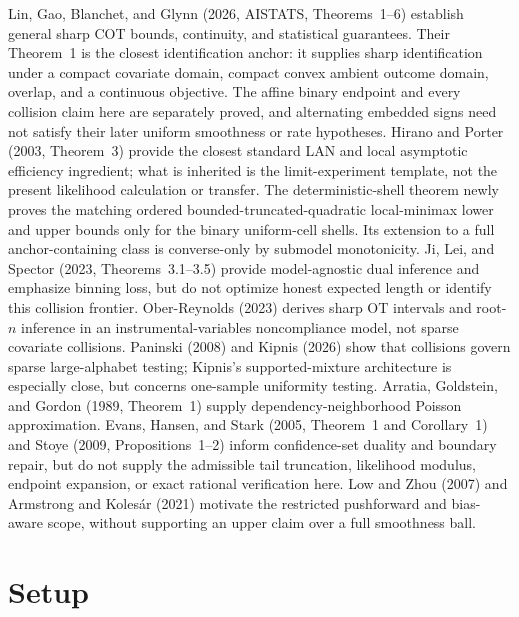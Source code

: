 \documentclass{article}
\begin{document}
Lin, Gao, Blanchet, and Glynn (2026, AISTATS, Theorems~1--6) establish general sharp COT bounds, continuity, and statistical guarantees. Their Theorem~1 is the closest identification anchor: it supplies sharp identification under a compact covariate domain, compact convex ambient outcome domain, overlap, and a continuous objective. The affine binary endpoint and every collision claim here are separately proved, and alternating embedded signs need not satisfy their later uniform smoothness or rate hypotheses. Hirano and Porter (2003, Theorem~3) provide the closest standard LAN and local asymptotic efficiency ingredient; what is inherited is the limit-experiment template, not the present likelihood calculation or transfer. The deterministic-shell theorem newly proves the matching ordered bounded-truncated-quadratic local-minimax lower and upper bounds only for the binary uniform-cell shells. Its extension to a full anchor-containing class is converse-only by submodel monotonicity. Ji, Lei, and Spector (2023, Theorems~3.1--3.5) provide model-agnostic dual inference and emphasize binning loss, but do not optimize honest expected length or identify this collision frontier. Ober-Reynolds (2023) derives sharp OT intervals and root-\(n\) inference in an instrumental-variables noncompliance model, not sparse covariate collisions. Paninski (2008) and Kipnis (2026) show that collisions govern sparse large-alphabet testing; Kipnis's supported-mixture architecture is especially close, but concerns one-sample uniformity testing. Arratia, Goldstein, and Gordon (1989, Theorem~1) supply dependency-neighborhood Poisson approximation. Evans, Hansen, and Stark (2005, Theorem~1 and Corollary~1) and Stoye (2009, Propositions~1--2) inform confidence-set duality and boundary repair, but do not supply the admissible tail truncation, likelihood modulus, endpoint expansion, or exact rational verification here. Low and Zhou (2007) and Armstrong and Koles\'ar (2021) motivate the restricted pushforward and bias-aware scope, without supporting an upper claim over a full smoothness ball.

\section{Setup}
\end{document}
